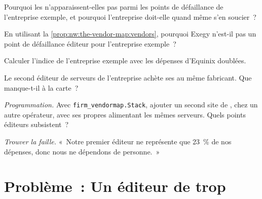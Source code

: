 \begin{exercise}[$\star$]\label{exo:nw:the-vendor-map:3}
Pourquoi les  n'apparaissent-elles pas parmi les points de défaillance de l'entreprise exemple, et pourquoi l'entreprise doit-elle quand même s'en soucier~?
\end{exercise}

\begin{exercise}[$\star\star$]\label{exo:nw:the-vendor-map:4}
En utilisant la \cref{prop:nw:the-vendor-map:vendors}, pourquoi Exegy n'est-il pas un point de défaillance éditeur pour l'entreprise exemple~?
\end{exercise}

\begin{exercise}[$\star\star$]\label{exo:nw:the-vendor-map:5}
Calculer l'indice de l'entreprise exemple avec les dépenses d'Equinix doublées.
\end{exercise}

\begin{exercise}[$\star\star$]\label{exo:nw:the-vendor-map:6}
Le second éditeur de serveurs de l'entreprise achète ses  au même fabricant. Que manque-t-il à la carte~?
\end{exercise}

\begin{exercise}[$\star\star\star$]\label{exo:nw:the-vendor-map:7}
\emph{Programmation.} Avec \texttt{firm\_vendormap.Stack}, ajouter un second site de , chez un autre opérateur, avec ses propres  alimentant les mêmes serveurs.
Quels points éditeurs subsistent~?
\end{exercise}

\begin{exercise}[$\star\star\star$]\label{exo:nw:the-vendor-map:8}
\emph{Trouver la faille.} «~Notre premier éditeur ne représente que 23~\% de nos dépenses, donc nous ne dépendons de personne.~»
\end{exercise}

\section{Problème~: Un éditeur de trop}

